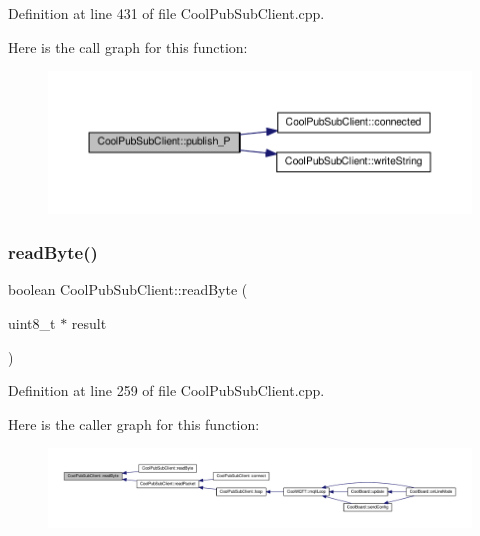 Definition at line 431 of file Cool\+Pub\+Sub\+Client.\+cpp.

Here is the call graph for this function\+:
\nopagebreak
\begin{figure}[H]
\begin{center}
\leavevmode
\includegraphics[width=350pt]{class_cool_pub_sub_client_a55458d47cf01f590e9b6647d5a418ab6_cgraph}
\end{center}
\end{figure}
\mbox{\label{class_cool_pub_sub_client_ad409bbd287d5894f0cf082f62446c002}} 
\subsubsection{\texorpdfstring{read\+Byte()}{readByte()}\hspace{0.1cm}{\footnotesize\ttfamily [1/2]}}
{\footnotesize\ttfamily boolean Cool\+Pub\+Sub\+Client\+::read\+Byte (\begin{DoxyParamCaption}\item[{uint8\+\_\+t $\ast$}]{result }\end{DoxyParamCaption})\hspace{0.3cm}{\ttfamily [private]}}



Definition at line 259 of file Cool\+Pub\+Sub\+Client.\+cpp.

Here is the caller graph for this function\+:
\nopagebreak
\begin{figure}[H]
\begin{center}
\leavevmode
\includegraphics[width=350pt]{class_cool_pub_sub_client_ad409bbd287d5894f0cf082f62446c002_icgraph}
\end{center}
\end{figure}
\mbox{\label{class_cool_pub_sub_client_abef3735bb9a2a8c87b3da659dc4ade03}} 
